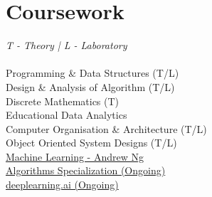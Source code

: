 \documentclass[]{deedy-resume-openfont}
\begin{document}
\begin{minipage}[t]{0.33\textwidth}
\section{Coursework}
\emph{T - Theory | L - Laboratory}\\~\\
Programming \& Data Structures (T/L)\\
Design \& Analysis of Algorithm (T/L) \\
Discrete Mathematics (T) \\
Educational Data Analytics \\
Computer Organisation \& Architecture (T/L) \\
Object Oriented System Designs (T/L) \\
\href{https://www.coursera.org/learn/machine-learning}{Machine Learning - Andrew Ng}\\
\href{https://www.coursera.org/specializations/algorithms?}{Algorithms Specialization (Ongoing)}\\
\href{https://www.coursera.org/specializations/deep-learning}{deeplearning.ai (Ongoing)}

\sectionsep



%
%

\end{minipage} 
\hfill
\end{document}
